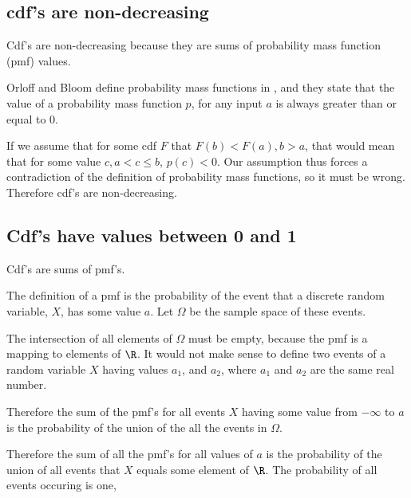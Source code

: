\documentclass[a4paper,11pt]{article}
\begin{document}
\subsection{cdf's are non-decreasing}

Cdf's are non-decreasing because they are sums of probability mass
function (pmf) values.

Orloff and Bloom define probability mass functions in \cite{reading4}, 
and they state that the value of a probability mass function $p$,
for any input $a$ is always greater than or equal to 0.

If we assume that for some cdf $F$ that $F \left( b \right) <
F \left(a \right), b > a$, that would mean that for some value
$c, a < c \leq b$, $p\left( c \right) < 0$.  Our assumption thus
forces a contradiction of the definition of probability mass functions,
so it must be wrong.  Therefore cdf's are non-decreasing.

\subsection{Cdf's have values between 0 and 1}

Cdf's are sums of pmf's.

The definition of a pmf is the probability of the event
that a discrete random variable, $X$, has some value $a$.
Let $\Omega$ be the sample space of these events.

The intersection of all elements of $\Omega$ must be
empty, because the pmf is a mapping to elements of $\R$. 
It would not make sense to define two events of a 
random variable  $X$ having values $a_{1}$, and $a_{2}$,
where $a_{1}$ and $a_{2}$ are the same real number.

Therefore the sum of the pmf's for all
events $X$ having some value from $-\infty$ to $a$ is the probability of the union
of the all the events in $\Omega$.

Therefore the sum of all the pmf's for all values of
$a$ is the probability of the union of all events 
that $X$ equals some element of $\R$. The probability
of all events occuring is one, 

\printbibliography{}
\end{document}
